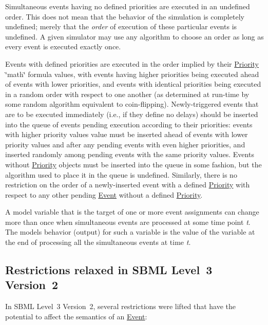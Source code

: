 \begin{DoxyItemize}
\item Simultaneous events having no defined priorities are executed in an undefined order. This does not mean that the behavior of the simulation is completely undefined; merely that the {\itshape order} of execution of these particular events is undefined. A given simulator may use any algorithm to choose an order as long as every event is executed exactly once.


\item Events with defined priorities are executed in the order implied by their \hyperlink{class_priority}{Priority} \char`\"{}math\char`\"{} formula values, with events having higher priorities being executed ahead of events with lower priorities, and events with identical priorities being executed in a random order with respect to one another (as determined at run-\/time by some random algorithm equivalent to coin-\/flipping). Newly-\/triggered events that are to be executed immediately (i.\+e., if they define no delays) should be inserted into the queue of events pending execution according to their priorities\+: events with higher priority values value must be inserted ahead of events with lower priority values and after any pending events with even higher priorities, and inserted randomly among pending events with the same priority values. Events without \hyperlink{class_priority}{Priority} objects must be inserted into the queue in some fashion, but the algorithm used to place it in the queue is undefined. Similarly, there is no restriction on the order of a newly-\/inserted event with a defined \hyperlink{class_priority}{Priority} with respect to any other pending \hyperlink{class_event}{Event} without a defined \hyperlink{class_priority}{Priority}.


\item A model variable that is the target of one or more event assignments can change more than once when simultaneous events are processed at some time point {\itshape t}. The model\textquotesingle{}s behavior (output) for such a variable is the value of the variable at the end of processing all the simultaneous events at time {\itshape t}.


\end{DoxyItemize}\hypertarget{class_event_l3v2_restrictions}{}\subsection{Restrictions relaxed in S\+B\+M\+L Level 3 Version 2}\label{class_event_l3v2_restrictions}
In S\+B\+ML Level~3 Version~2, several restrictions were lifted that have the potential to affect the semantics of an \hyperlink{class_event}{Event}\+:


